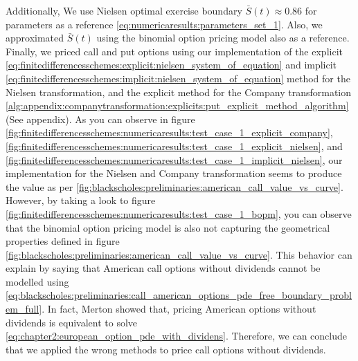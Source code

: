Additionally, We use Nielsen \cite{nielsen_2001} optimal exercise boundary $\bar{S}(t) \approx 0.86$ for parameters as a reference \eqref{eq:numericaresults:parameters_set_1}. Also, we approximated $\bar{S}(t)$ using the binomial option pricing model also as a reference. Finally, we priced call and put options using our implementation of the explicit \eqref{eq:finitedifferencesschemes:explicit:nielsen_system_of_equation} and implicit \eqref{eq:finitedifferencesschemes:implicit:nielsen_system_of_equation} method for the Nielsen transformation, and the explicit method for the Company transformation \eqref{alg:appendix:companytransformation:explicits:put_explicit_method_algorithm} (See appendix). As you can observe in figure \eqref{fig:finitedifferencesschemes:numericaresults:test_case_1_explicit_company},
\eqref{fig:finitedifferencesschemes:numericaresults:test_case_1_explicit_nielsen}, and \eqref{fig:finitedifferencesschemes:numericaresults:test_case_1_implicit_nielsen},
our implementation for the Nielsen and Company transformation seems to produce the value as per \eqref{fig:blackscholes:preliminaries:american_call_value_vs_curve}. However, by taking a look to figure \eqref{fig:finitedifferencesschemes:numericaresults:test_case_1_bopm}, you can observe that the binomial option pricing model is also not capturing the geometrical properties defined in figure \eqref{fig:blackscholes:preliminaries:american_call_value_vs_curve}. This behavior can explain by saying that American call options without dividends cannot be modelled using \eqref{eq:blackscholes:preliminaries:call_american_options_pde_free_boundary_problem_full}. In fact, Merton \cite{merton_1973} showed that, pricing American options without dividends is equivalent to solve \eqref{eq:chapter2:european_option_pde_with_dividens}. Therefore, we can conclude that we applied the wrong methods to price call options without dividends. 
